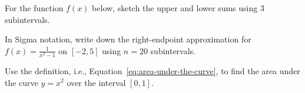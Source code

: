 \documentclass[../main.tex]{subfiles}
\begin{document}
\begin{example}
  For the function \(f(x)\) below, sketch the upper and lower sums using \(3\) subintervals.

  \hfill{}
  
  \hfill{}
  
  \hfill{}

\end{example}

\begin{example}
  In Sigma notation, write down the right-endpoint approximation for \(f(x) = \frac{1}{x^{2} - 1}\) on \([-2, 5]\) using \(n = 20\) subintervals.
\end{example}
\clearpage

\begin{example}
  Use the definition, i.e., Equation~\eqref{eq:area-under-the-curve}, to find the area under the curve \(y = x^{2}\) over the interval \([0,1]\).

\end{example}
\end{document}
